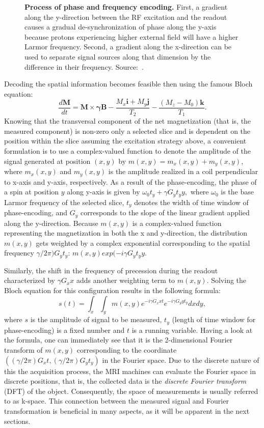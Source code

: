 \begin{figure}[tb]
\begin{minipage}{0.53\textwidth}
        \caption{\textbf{Process of phase and frequency encoding.} First, a gradient along the y-direction between the RF excitation and the readout causes a gradual de-synchronization of phase along the y-axis because protons experiencing higher external field will have a higher Larmor frequency. Second, a gradient along the x-direction can be used to separate signal sources along that dimension by the difference in their frequency. Source:~\cite{ridgway_cardiovascular_2010}.}
        \label{fig:phase_and_freq_encoding}
    \end{minipage}
\end{figure}

Decoding the spatial information becomes feasible then using the famous Bloch equation:
\[\frac{d\textbf{M}}{dt} = \textbf{M} \times \boldsymbol{\gamma} \textbf{B} - \frac{M_x\textbf{i} + M_y\textbf{j}}{T_2} - \frac{(M_z - M_0)\textbf{k}}{T_1}.\]
Knowing that the transversal component of the net magnetization (that is, the measured component) is non-zero only a selected slice and is dependent on the position within the slice assuming the excitation strategy above, a convenient formulation is to use a complex-valued function to denote the amplitude of the signal generated at position $(x,y)$ by $m(x,y) = m_x(x,y) + m_y(x,y)$, where $m_x(x,y)$ and $m_y(x,y)$ is the amplitude realized in a coil perpendicular to x-axis and y-axis, respectively. As a result of the phase-encoding, the phase of a spin at position $y$ along y-axis is given by $\omega_0 t_y + \gamma G_y t_y y,$ where $\omega_0$ is the base Larmor frequency of the selected slice, $t_y$ denotes the width of time window of phase-encoding, and $G_y$ corresponds to the slope of the linear gradient applied along the y-direction. Because $m(x,y)$ is a complex-valued function representing the magnetization in both the x and y-direction, the distribution $m(x,y)$ gets weighted by a complex exponential corresponding to the spatial frequency $\gamma/2\pi)G_y t_y$: $m(x,y)exp(-i\gamma G_y t_y y$. 

Similarly, the shift in the frequency of precession during the readout characterized by $\gamma G_x x$ adds another weighting term to $m(x,y)$. Solving the Bloch equation for this configuration results in the following formula:
\[s(t) = \int_x \int_y m(x,y) e^{-i\gamma G_x x t} e^{-i\gamma G_y y t_y} dx dy,\]
where $s$ is the amplitude of signal to be measured, $t_y$ (length of time window for phase-encoding) is a fixed number and $t$ is a running variable. Having a look at the formula, one can immediately see that it is the 2-dimensional Fourier transform of $m(x,y)$ corresponding to the coordinate $((\gamma/2\pi)G_x t, (\gamma/2\pi)G_y t_y)$ in the Fourier space. Due to the discrete nature of this the acquisition process, the MRI machines can evaluate the Fourier space in discrete positions, that is, the collected data is the \textit{discrete Fourier transform} (DFT) of the object. Consequently, the space of measurements is usually referred to as k-space. This connection between the measured signal and Fourier transformation is beneficial in many aspects, as it will be apparent in the next sections.

